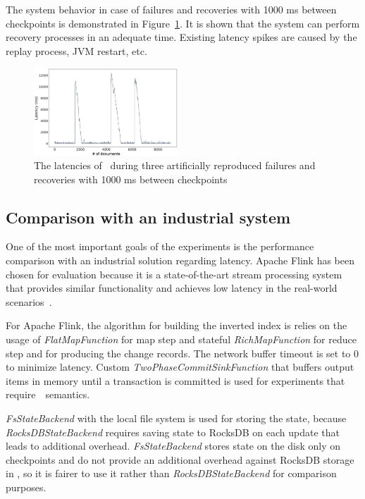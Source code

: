 The system behavior in case of failures and recoveries with 1000 ms between checkpoints is demonstrated in Figure~\ref{recovery}. It is shown that the system can perform recovery processes in an adequate time. Existing latency spikes are caused by the replay process, JVM restart, etc.

\begin{figure}[htbp]
  \centering
  \includegraphics[width=0.48\textwidth]{pics/blink-2}
  \caption{The latencies of \FlameStream\ during three artificially reproduced failures and recoveries with 1000 ms between checkpoints}
  \label {recovery}
\end{figure}

\subsection{Comparison with an industrial system}
One of the most important goals of the experiments is the performance comparison with an industrial solution regarding latency. Apache Flink has been chosen for evaluation because it is a state-of-the-art stream processing system that provides similar functionality and achieves low latency in the real-world scenarios~\cite{S7530084}. 

For Apache Flink, the algorithm for building the inverted index is relies on the usage of {\it FlatMapFunction} for map step and stateful {\it RichMapFunction} for reduce step and for producing the change records. The network buffer timeout is set to 0 to minimize latency. Custom {\it TwoPhaseCommitSinkFunction} that buffers output items in memory until a transaction is committed is used for experiments that require~\eo\ semantics. 

{\it FsStateBackend} with the local file system is used for storing the state, because {\it RocksDBStateBackend} requires saving state to RocksDB on each update that leads to additional overhead. {\it FsStateBackend} stores state on the disk only on checkpoints and do not provide an additional overhead against RocksDB storage in \FlameStream, so it is fairer to use it rather than {\it RocksDBStateBackend} for comparison purposes.

